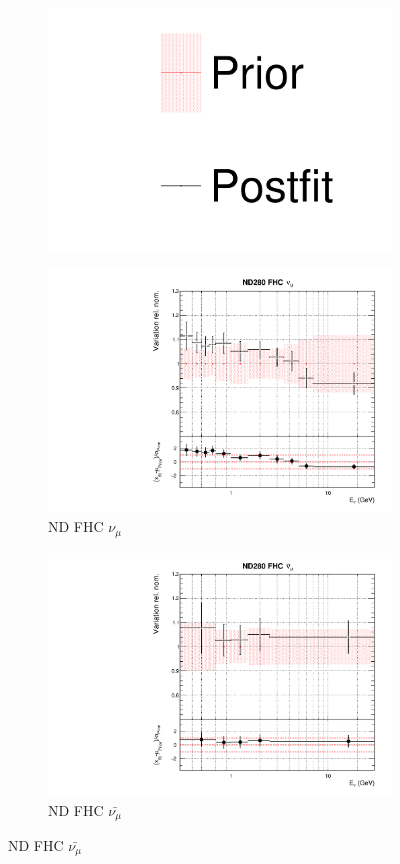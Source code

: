 \begin{figure}
\centering
\begin{subfigure}{0.95\textwidth}
  \centering
  \includegraphics[width=0.24\linewidth]{figs/dat_leg}
\end{subfigure}
\begin{subfigure}{0.24\textwidth}
  \centering
  \includegraphics[width=0.95\linewidth]{figs/datflux0}
  \caption{ND FHC $\nu_{\mu}$}
\end{subfigure}
\begin{subfigure}{0.24\textwidth}
  \centering
  \includegraphics[width=0.95\linewidth]{figs/datflux1}
  \caption{ND FHC $\bar{\nu_{\mu}}$}

\end{subfigure}
\end{figure}
